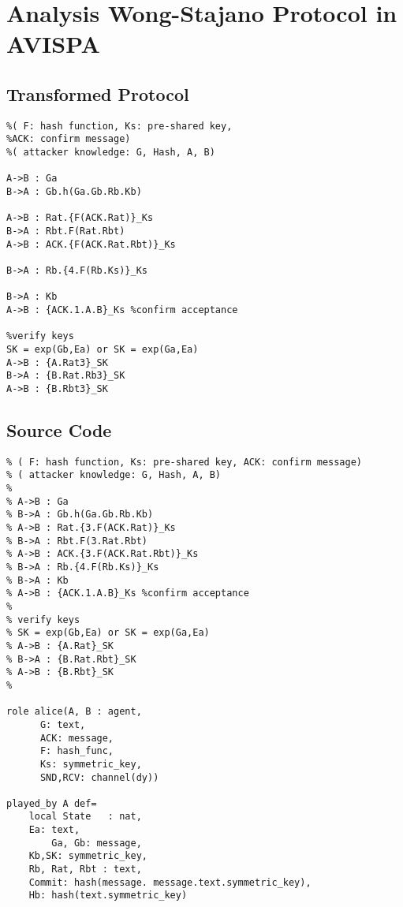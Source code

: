 
\chapter{Analysis Wong-Stajano Protocol in AVISPA} %

\label{appB} %

\section{Transformed Protocol}

{\small 
\begin{Verbatim}[fontsize=\small]
%Wong Stajano Protocol - OOB Transformation
%( F: hash function, Ks: pre-shared key, 
%ACK: confirm message)
%( attacker knowledge: G, Hash, A, B)

A->B : Ga
B->A : Gb.h(Ga.Gb.Rb.Kb)

A->B : Rat.{F(ACK.Rat)}_Ks
B->A : Rbt.F(Rat.Rbt)
A->B : ACK.{F(ACK.Rat.Rbt)}_Ks

B->A : Rb.{4.F(Rb.Ks)}_Ks

B->A : Kb
A->B : {ACK.1.A.B}_Ks %confirm acceptance

%verify keys
SK = exp(Gb,Ea) or SK = exp(Ga,Ea)
A->B : {A.Rat3}_SK
B->A : {B.Rat.Rb3}_SK
A->B : {B.Rbt3}_SK
\end{Verbatim}

\section{Source Code}
{\small 
\begin{Verbatim}[fontsize=\small]
%%Wong Stajano Protocol - OOB Transformation
% ( F: hash function, Ks: pre-shared key, ACK: confirm message)
% ( attacker knowledge: G, Hash, A, B)
%
% A->B : Ga
% B->A : Gb.h(Ga.Gb.Rb.Kb)
% A->B : Rat.{3.F(ACK.Rat)}_Ks
% B->A : Rbt.F(3.Rat.Rbt)
% A->B : ACK.{3.F(ACK.Rat.Rbt)}_Ks
% B->A : Rb.{4.F(Rb.Ks)}_Ks
% B->A : Kb
% A->B : {ACK.1.A.B}_Ks %confirm acceptance
%
% verify keys
% SK = exp(Gb,Ea) or SK = exp(Ga,Ea)
% A->B : {A.Rat}_SK
% B->A : {B.Rat.Rbt}_SK
% A->B : {B.Rbt}_SK
%

role alice(A, B : agent,
	  G: text,
      ACK: message,
      F: hash_func,
	  Ks: symmetric_key,
	  SND,RCV: channel(dy))

played_by A def=
	local State   : nat,
	Ea: text,
        Ga, Gb: message,
	Kb,SK: symmetric_key, 
	Rb, Rat, Rbt : text,
 	Commit: hash(message. message.text.symmetric_key),
	Hb: hash(text.symmetric_key)


\end{Verbatim}}}
